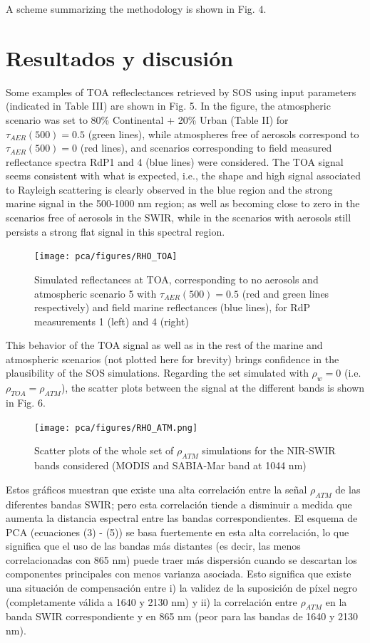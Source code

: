 A scheme summarizing the methodology is shown in Fig. 4.

\section{Resultados y discusión}
Some examples of TOA refleclectances retrieved by SOS using input parameters (indicated in Table III) are shown in Fig. 5. In the figure, the atmospheric scenario was set to 80\% Continental + 20\% Urban (Table II) for $\tau_{AER}(500)=0.5$ (green lines), while atmospheres free of aerosols correspond to $\tau_{AER}(500)=0$ (red lines), and scenarios corresponding to field measured reflectance spectra RdP1 and 4 (blue lines) were considered. The TOA signal seems consistent with what is expected, i.e., the shape and high signal associated to Rayleigh scattering is clearly observed in the blue region and the strong marine signal in the 500-1000 nm region; as well as becoming close to zero in the scenarios free of aerosols in the SWIR, while in the scenarios with aerosols still persists a strong flat signal in this spectral region.

\begin{figure}
\centering
\texttt{[image: pca/figures/RHO\_TOA]}
\caption{Simulated reflectances at TOA, corresponding to no aerosols and atmospheric scenario 5 with $\tau_{AER}(500)=0.5$ (red and green lines respectively) and field marine reflectances (blue lines), for RdP measurements 1 (left) and 4 (right)}
\label{pca:rho_toa}
\end{figure}

This behavior of the TOA signal as well as in the rest of the marine and atmospheric scenarios (not plotted here for brevity) brings confidence in the plausibility of the SOS simulations. Regarding the set simulated with $\rho_{w}=0$ (i.e. $\rho_{TOA}=\rho_{ATM}$), the scatter plots between the signal at the different bands is shown in Fig. 6.

\begin{figure}
\centering
\texttt{[image: pca/figures/RHO\_ATM.png]}
\caption{Scatter plots of the whole set of $\rho_{ATM}$ simulations for the NIR-SWIR bands considered (MODIS and SABIA-Mar band at 1044 nm)}
\label{pca:rho_atm}
\end{figure}

Estos gráficos muestran que existe una alta correlación entre la señal $\rho_{ATM}$ de las diferentes bandas SWIR; pero esta correlación tiende a disminuir a medida que aumenta la distancia espectral entre las bandas correspondientes. El esquema de PCA (ecuaciones (3) - (5)) se basa fuertemente en esta alta correlación, lo que significa que el uso de las bandas más distantes (es decir, las menos correlacionadas con 865 nm) puede traer más dispersión cuando se descartan los componentes principales con menos varianza asociada. Esto significa que existe una situación de compensación entre i) la validez de la suposición de píxel negro (completamente válida a 1640 y 2130 nm) y ii) la correlación entre $ \rho_{ATM}$ en la banda SWIR correspondiente y en 865 nm (peor para las bandas de 1640 y 2130 nm). 

